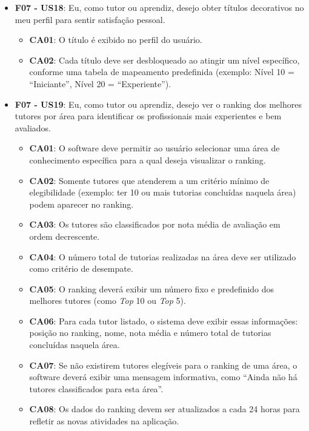 \begin{itemize}
\begin{itemize}
\end{itemize}

\item \textbf{F07 - US18}: Eu, como tutor ou aprendiz, desejo obter títulos decorativos no meu perfil para sentir satisfação pessoal.

\begin{itemize}

\item \textbf{CA01}: O título é exibido no perfil do usuário. 

\item \textbf{CA02}: Cada título deve ser desbloqueado ao atingir um nível específico, conforme uma tabela de mapeamento predefinida (exemplo: Nível 10 = ``Iniciante'', Nível 20 = ``Experiente'').

\end{itemize}

\item \textbf{F07 - US19}: Eu, como tutor ou aprendiz, desejo ver o ranking dos melhores tutores por área para identificar os profissionais mais experientes e bem avaliados.

\begin{itemize}

\item \textbf{CA01}: O software deve permitir ao usuário selecionar uma área de conhecimento específica para a qual deseja visualizar o ranking.

\item \textbf{CA02}: Somente tutores que atenderem a um critério mínimo de elegibilidade (exemplo: ter 10 ou mais tutorias concluídas naquela área) podem aparecer no ranking.

\item \textbf{CA03}: Os tutores são classificados por nota média de avaliação em ordem decrescente.

\item \textbf{CA04}: O número total de tutorias realizadas na área deve ser utilizado como critério de desempate.

\item \textbf{CA05}: O ranking deverá exibir um número fixo e predefinido dos melhores tutores (como \textit{Top} 10 ou \textit{Top} 5).

\item \textbf{CA06}: Para cada tutor listado, o sistema deve exibir essas informações: posição no ranking, nome, nota média e número total de tutorias concluídas naquela área.

\item \textbf{CA07}: Se não existirem tutores elegíveis para o ranking de uma área, o software deverá exibir uma mensagem informativa, como ``Ainda não há tutores classificados para esta área''.

\item \textbf{CA08}: Os dados do ranking devem ser atualizados a cada 24 horas para refletir as novas atividades na aplicação.

\end{itemize}

\end{itemize}

